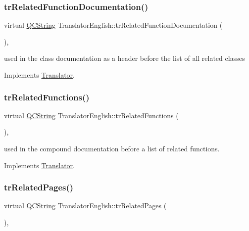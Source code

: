 \subsubsection{\texorpdfstring{trRelatedFunctionDocumentation()}{trRelatedFunctionDocumentation()}}
{\footnotesize\ttfamily virtual \mbox{\hyperlink{class_q_c_string}{Q\+C\+String}} Translator\+English\+::tr\+Related\+Function\+Documentation (\begin{DoxyParamCaption}{ }\end{DoxyParamCaption})\hspace{0.3cm}{\ttfamily [inline]}, {\ttfamily [virtual]}}

used in the class documentation as a header before the list of all related classes 

Implements \mbox{\hyperlink{class_translator}{Translator}}.

\mbox{\label{class_translator_english_a11afb6f5259dcc95534ee7da5ce4b7d2}} 
\subsubsection{\texorpdfstring{trRelatedFunctions()}{trRelatedFunctions()}}
{\footnotesize\ttfamily virtual \mbox{\hyperlink{class_q_c_string}{Q\+C\+String}} Translator\+English\+::tr\+Related\+Functions (\begin{DoxyParamCaption}{ }\end{DoxyParamCaption})\hspace{0.3cm}{\ttfamily [inline]}, {\ttfamily [virtual]}}

used in the compound documentation before a list of related functions. 

Implements \mbox{\hyperlink{class_translator}{Translator}}.

\mbox{\label{class_translator_english_a1ce24d9a00969dea3f95ca0b18bf0398}} 
\subsubsection{\texorpdfstring{trRelatedPages()}{trRelatedPages()}}
{\footnotesize\ttfamily virtual \mbox{\hyperlink{class_q_c_string}{Q\+C\+String}} Translator\+English\+::tr\+Related\+Pages (\begin{DoxyParamCaption}{ }\end{DoxyParamCaption})\hspace{0.3cm}{\ttfamily [inline]}, {\ttfamily [virtual]}}

